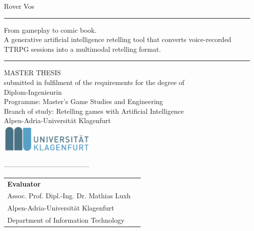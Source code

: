 \begin{titlepage}
\begin{center}

    {\LARGE Rover Vos\\}
    \vspace{5mm}
    \rule{\textwidth}{1pt}
	{ \LARGE From gameplay to comic book.   \\
	\vspace*{3mm}A generative artificial intelligence retelling tool that converts voice-recorded TTRPG sessions into a multimodal retelling format.}
	\vspace*{3mm}
\rule{\textwidth}{1pt}

    \vspace{15mm}
	{\LARGE \sc MASTER THESIS} \\
    \vspace{8mm}
	\normalsize{submitted in fulfilment of the requirements for the degree of}\\
	\vspace{8mm}
	\Large{Diplom-Ingenieurin}\\
	\vspace{8mm}
	\normalsize{Programme: Master’s Game Studies and Engineering}\\	\vspace{2mm}
	\normalsize{Branch of study: Retelling games with Artificial Intelligence}\\
	\vspace{2mm}
     \vspace{8mm}%
	\Large{Alpen-Adria-Universit\"at Klagenfurt}\\
    \vspace{4mm}
    \includegraphics[width=0.35\textwidth]{images/uniklulogo.png}

  \vspace{0.5 mm}%
  -------------------------------------- \\
\end{center}

    \vspace{1mm}
    \enlargethispage{1cm}

\begin{tabular}{ l l }

\textbf{Evaluator}\\
Assoc. Prof. Dipl.-Ing. Dr. Mathias Luxh \\
Alpen-Adria-Universit\"at Klagenfurt \\
Department of Information Technology\\

\end{tabular}


\vspace{10mm}
\\    

\end{titlepage}

\afterpage{\blankpage}
	
	